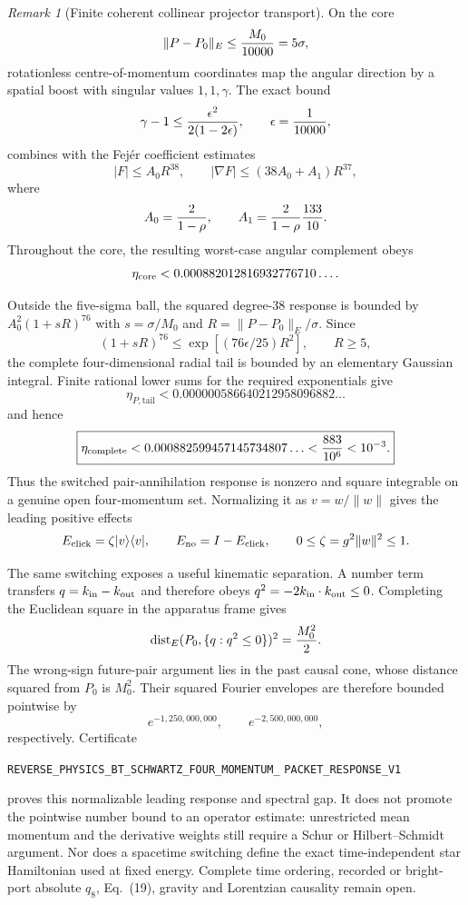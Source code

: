 \documentclass[11pt]{article}
\theoremstyle{definition}
\theoremstyle{remark}
\newtheorem{remark}[theorem]{Remark}
\begin{document}
\begin{remark}[Finite coherent collinear projector transport]
On the core
\[
 \|P-P_0\|_E\leq {M_0\over10000}=5\sigma,
\]
rotationless centre-of-momentum coordinates map the angular direction by a
spatial boost with singular values $1,1,\gamma$.  The exact bound
\[
 \gamma-1\leq {\epsilon^2\over2(1-2\epsilon)},
 \qquad \epsilon={1\over10000},
\]
combines with the Fej\'er coefficient estimates
\[
 |F|\leq A_0R^{38},\qquad
 |\nabla F|\leq(38A_0+A_1)R^{37},
\]
where
\[
 A_0={2\over1-\rho},\qquad
 A_1={2\over1-\rho}{133\over10}.
\]
Throughout the core, the resulting worst-case angular complement obeys
\[
 \eta_{\rm core}<0.000882012816932776710\ldots .
\]

Outside the five-sigma ball, the squared degree-38 response is bounded by
$A_0^2(1+sR)^{76}$ with $s=\sigma/M_0$ and
$R=\|P-P_0\|_E/\sigma$.  Since
\[
 (1+sR)^{76}\leq
 \exp[(76\epsilon/25)R^2],\qquad R\geq5,
\]
the complete four-dimensional radial tail is bounded by an elementary
Gaussian integral.  Finite rational lower sums for the required exponentials
give
\[
 \eta_{P,\mathrm{tail}}
 <0.000000586640212958096882\ldots
\]
and hence
\[
 \boxed{\eta_{\rm complete}
 <0.000882599457145734807\ldots
 <{883\over10^6}<10^{-3}.}
\]
Thus the switched pair-annihilation response is nonzero and square integrable
on a genuine open four-momentum set.  Normalizing it as $v=w/\|w\|$ gives the
leading positive effects
\[
 E_{\rm click}=\zeta|v\rangle\langle v|,
 \qquad E_{\rm no}=I-E_{\rm click},
 \qquad0\leq\zeta=g^2\|w\|^2\leq1.
\]

The same switching exposes a useful kinematic separation.  A number term
transfers $q=k_{\rm in}-k_{\rm out}$ and therefore obeys
$q^2=-2k_{\rm in}\cdot k_{\rm out}\leq0$.  Completing the Euclidean square
in the apparatus frame gives
\[
 \operatorname{dist}_E(P_0,\{q:q^2\leq0\})^2={M_0^2\over2}.
\]
The wrong-sign future-pair argument lies in the past causal cone, whose
distance squared from $P_0$ is $M_0^2$.  Their squared Fourier envelopes are
therefore bounded pointwise by
\[
 e^{-1,250,000,000},\qquad e^{-2,500,000,000},
\]
respectively.  Certificate
\par\noindent
\texttt{REVERSE\_PHYSICS\_BT\_SCHWARTZ\_FOUR\_MOMENTUM\_}
\allowbreak\texttt{PACKET\_RESPONSE\_V1}
\par\noindent
proves this normalizable leading response and spectral gap.  It does not
promote the pointwise number bound to an operator estimate: unrestricted mean
momentum and the derivative weights still require a Schur or
Hilbert--Schmidt argument.  Nor does a spacetime switching define the exact
time-independent star Hamiltonian used at fixed energy.  Complete time
ordering, recorded or bright-port absolute $q_8$, Eq.~(19), gravity and
Lorentzian causality remain
open.


\end{remark}
\end{document}
